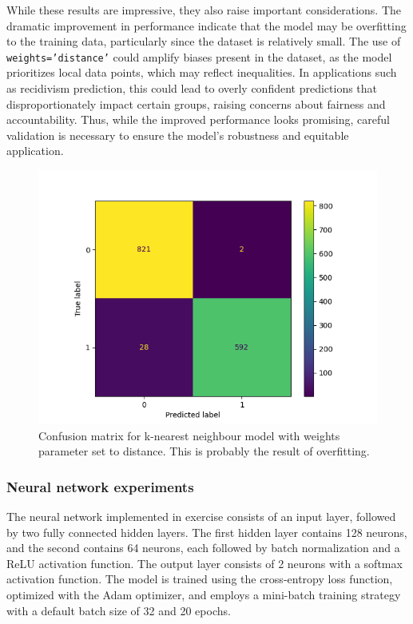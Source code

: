 While these results are impressive, they also raise important considerations. The dramatic improvement in performance indicate that the model may be overfitting to the training data, particularly since the dataset is relatively small. The use of \texttt{weights='distance'} could amplify biases present in the dataset, as the model prioritizes local data points, which may reflect inequalities. In applications such as recidivism prediction, this could lead to overly confident predictions that disproportionately impact certain groups, raising concerns about fairness and accountability. Thus, while the improved performance looks promising, careful validation is necessary to ensure the model's robustness and equitable application.

\begin{figure}[H]
	\centering
	\includegraphics[width=0.7\linewidth]{img/knn_cm_distance}
	\caption{Confusion matrix for k-nearest neighbour model with weights parameter set to distance. This is probably the result of overfitting.}
	\label{fig:knncmdistance}
\end{figure}

\bigskip
\subsubsection{Neural network experiments}

The neural network implemented in exercise consists of an input layer, followed by two fully connected hidden layers. The first hidden layer contains 128 neurons, and the second contains 64 neurons, each followed by batch normalization and a ReLU activation function. The output layer consists of 2 neurons with a softmax activation function. The model is trained using the cross-entropy loss function, optimized with the Adam optimizer, and employs a mini-batch training strategy with a default batch size of 32 and 20 epochs.

